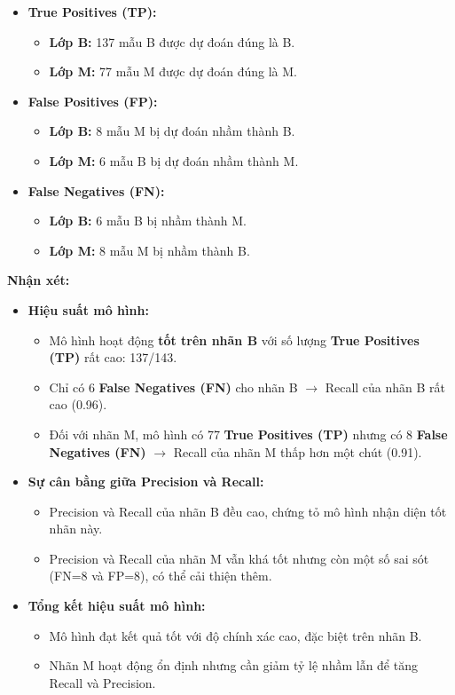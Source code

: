 \begin{itemize}
	\item \textbf{True Positives (TP):}
	\begin{itemize}
		\item \textbf{Lớp B:} 137 mẫu B được dự đoán đúng là B.
		\item \textbf{Lớp M:} 77 mẫu M được dự đoán đúng là M.
	\end{itemize}
	
	\item \textbf{False Positives (FP):}
	\begin{itemize}
		\item \textbf{Lớp B:} 8 mẫu M bị dự đoán nhầm thành B.
		\item \textbf{Lớp M:} 6 mẫu B bị dự đoán nhầm thành M.
	\end{itemize}
	
	\item \textbf{False Negatives (FN):}
	\begin{itemize}
		\item \textbf{Lớp B:} 6 mẫu B bị nhầm thành M.
		\item \textbf{Lớp M:} 8 mẫu M bị nhầm thành B.
	\end{itemize}
\end{itemize}

\textbf{Nhận xét:}
\begin{itemize}
	\item \textbf{Hiệu suất mô hình:}
	\begin{itemize}
		\item Mô hình hoạt động \textbf{tốt trên nhãn B} với số lượng \textbf{True Positives (TP)} rất cao: 137/143.
		\item Chỉ có 6 \textbf{False Negatives (FN)} cho nhãn B $\rightarrow$ Recall của nhãn B rất cao (0.96).
		\item Đối với nhãn M, mô hình có 77 \textbf{True Positives (TP)} nhưng có 8 \textbf{False Negatives (FN)} $\rightarrow$ Recall của nhãn M thấp hơn một chút (0.91).
	\end{itemize}
	
	\item \textbf{Sự cân bằng giữa Precision và Recall:}
	\begin{itemize}
		\item Precision và Recall của nhãn B đều cao, chứng tỏ mô hình nhận diện tốt nhãn này.
		\item Precision và Recall của nhãn M vẫn khá tốt nhưng còn một số sai sót (FN=8 và FP=8), có thể cải thiện thêm.
	\end{itemize}
	
	\item \textbf{Tổng kết hiệu suất mô hình:}
	\begin{itemize}
		\item Mô hình đạt kết quả tốt với độ chính xác cao, đặc biệt trên nhãn B.
		\item Nhãn M hoạt động ổn định nhưng cần giảm tỷ lệ nhầm lẫn để tăng Recall và Precision.
	\end{itemize}
\end{itemize}



